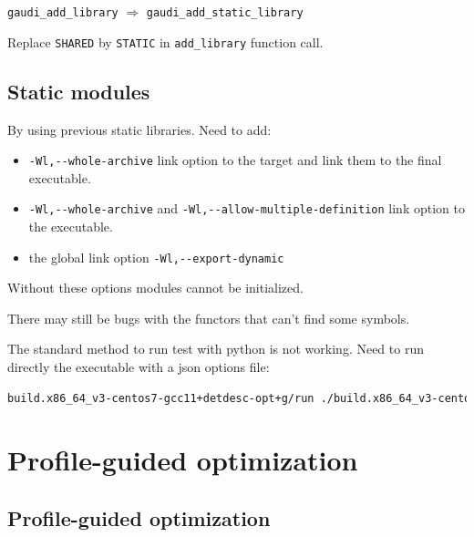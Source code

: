 \documentclass{beamer}
\begin{document}
    \begin{frame}[fragile]
        \verb'gaudi_add_library' $\Rightarrow$ \verb'gaudi_add_static_library'

        Replace \verb'SHARED' by \verb'STATIC' in \verb'add_library' function call.
    \end{frame}

    \subsection{Static modules}

    \begin{frame}[fragile]
        By using previous static libraries.
        Need to add:
        \begin{itemize}
            \item \verb'-Wl,--whole-archive' link option to the target and link them to the final executable.
            \item \verb'-Wl,--whole-archive' and \verb'-Wl,--allow-multiple-definition' link option to the executable.
            \item the global link option \verb'-Wl,--export-dynamic'
        \end{itemize}
        Without these options modules cannot be initialized.

        There may still be bugs with the functors that can't find some symbols.
    \end{frame}

    \begin{frame}[fragile]
        The standard method to run test with python is not working. Need to run directly the executable with a json options file:
        \begin{lstlisting}[language=bash,basicstyle=\tiny,breaklines]
            build.x86_64_v3-centos7-gcc11+detdesc-opt+g/run ./build.x86_64_v3-centos7-gcc11+detdesc-opt+g/Gaudi/Gaudi/Gaudi_static options.json
        \end{lstlisting}
    \end{frame}

\section{Profile-guided optimization}

    \subsection{Profile-guided optimization}
\end{document}
